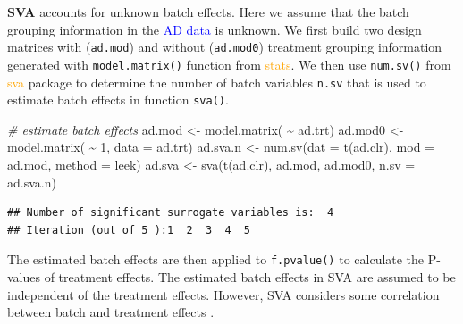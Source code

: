 \documentclass[
]{book}
\newenvironment{Shaded}{\begin{snugshade}}{\end{snugshade}}
\newcommand{\AttributeTok}[1]{\textcolor[rgb]{0.77,0.63,0.00}{#1}}
\newcommand{\CommentTok}[1]{\textcolor[rgb]{0.56,0.35,0.01}{\textit{#1}}}
\newcommand{\DecValTok}[1]{\textcolor[rgb]{0.00,0.00,0.81}{#1}}
\newcommand{\FunctionTok}[1]{\textcolor[rgb]{0.00,0.00,0.00}{#1}}
\newcommand{\NormalTok}[1]{#1}
\newcommand{\OtherTok}[1]{\textcolor[rgb]{0.56,0.35,0.01}{#1}}
\newcommand{\SpecialCharTok}[1]{\textcolor[rgb]{0.00,0.00,0.00}{#1}}
\newcommand{\StringTok}[1]{\textcolor[rgb]{0.31,0.60,0.02}{#1}}
\begin{document}
\textbf{SVA} accounts for unknown batch effects. Here we assume that the batch grouping information in the \textcolor{blue}{AD data} is unknown. We first build two design matrices with (\texttt{ad.mod}) and without (\texttt{ad.mod0}) treatment grouping information generated with \texttt{model.matrix()} function from \textcolor{orange}{stats}. We then use \texttt{num.sv()} from \textcolor{orange}{sva} package to determine the number of batch variables \texttt{n.sv} that is used to estimate batch effects in function \texttt{sva()}.

\begin{Shaded}
\begin{Highlighting}[]
\CommentTok{\# estimate batch effects}
\NormalTok{ad.mod }\OtherTok{\textless{}{-}} \FunctionTok{model.matrix}\NormalTok{( }\SpecialCharTok{\textasciitilde{}}\NormalTok{ ad.trt)}
\NormalTok{ad.mod0 }\OtherTok{\textless{}{-}} \FunctionTok{model.matrix}\NormalTok{( }\SpecialCharTok{\textasciitilde{}} \DecValTok{1}\NormalTok{, }\AttributeTok{data =}\NormalTok{ ad.trt)}
\NormalTok{ad.sva.n }\OtherTok{\textless{}{-}} \FunctionTok{num.sv}\NormalTok{(}\AttributeTok{dat =} \FunctionTok{t}\NormalTok{(ad.clr), }\AttributeTok{mod =}\NormalTok{ ad.mod, }\AttributeTok{method =} \StringTok{\textquotesingle{}leek\textquotesingle{}}\NormalTok{)}
\NormalTok{ad.sva }\OtherTok{\textless{}{-}} \FunctionTok{sva}\NormalTok{(}\FunctionTok{t}\NormalTok{(ad.clr), ad.mod, ad.mod0, }\AttributeTok{n.sv =}\NormalTok{ ad.sva.n)}
\end{Highlighting}
\end{Shaded}

\begin{verbatim}
## Number of significant surrogate variables is:  4 
## Iteration (out of 5 ):1  2  3  4  5
\end{verbatim}

The estimated batch effects are then applied to \texttt{f.pvalue()} to calculate the P-values of treatment effects. The estimated batch effects in SVA are assumed to be independent of the treatment effects. However, SVA considers some correlation between batch and treatment effects \citep{wang2020managing}.

\begin{Shaded}
\end{Shaded}
\end{document}
